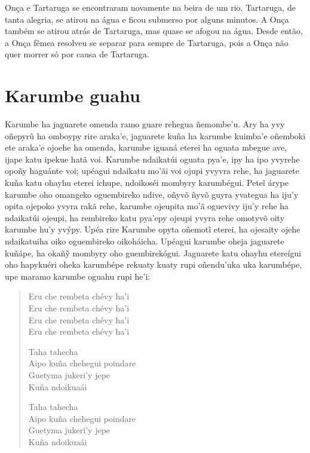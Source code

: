 
Onça e Tartaruga se encontraram novamente na beira de um rio. Tartaruga,
de tanta alegria, se atirou na água e ficou submerso por alguns minutos.
A Onça também se atirou atrás de Tartaruga, mas quase se afogou na água.
Desde então, a Onça fêmea resolveu se separar para sempre de Tartaruga,
pois a Onça não quer morrer só por causa de Tartaruga.

\chapter{Karumbe guahu}

Karumbe ha jaguarete omenda ramo guare rehegua ñemombe'u. Ary ha yvy
oñepyrũ ha omboypy rire araka'e, jaguarete kuña ha karumbe kuimba'e
oñemboki ete araka'e ojoehe ha omenda, karumbe iguaná eterei ha oguata
mbegue ave, ijape katu ipekue hatã voi. Karumbe ndaikatúi oguata pya'e,
ipy ha ipo yvyrehe opoñy haguánte voi; upéagui ndaikatu mo'ãi voi ojupi
yvyvra rehe, ha jaguarete kuña katu ohayhu eterei ichupe, ndoikoséi
mombyry karumbégui. Peteĩ árype karumbe oho omangeko oguembireko ndive,
oñyvõ ñyvõ guyra yvategua ha iju'y opita ojepoko yvyra rakã rehe,
karumbe ojeupita mo'ã oguevivy iju'y rehe ha ndaikatúi ojeupi, ha
rembireko katu pya'epy ojeupi yvyra rehe omotyvõ oity karumbe hu'y
yvýpy. Upéa rire Karumbe opyta oñemotĩ eterei, ha ojesaity ojehe
ndaikatuiha oiko oguembireko oikoháicha. Upéagui karumbe oheja jaguarete
kuñápe, ha okañỹ mombyry oho guembirekógui. Jaguarete katu ohayhu
etereígui oho hapykuéri oheka karumbépe rekuaty kuaty rupi oñendu'uka
uka karumbépe, upe maramo karumbe oguahu rupi he'i:

\begin{verse}
Eru che rembeta chévy ha'i\\
Eru che rembeta chévy ha'i\\
Eru che rembeta chévy ha'i\\
Eru che rembeta chévy ha'i
       
Taha tahecha\\
Aipo kuña chehegui poindare\\
Guetyma jukeri'y jepe\\
Kuña ndoikuaái
       
Taha tahecha\\
Aipo kuña chehegui poindare\\
Guetyma jukeri'y jepe\\
Kuña ndoikuaái
\end{verse}



